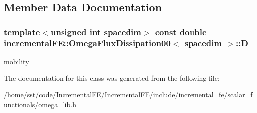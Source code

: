 \subsection{Member Data Documentation}
\subsubsection[{\texorpdfstring{D}{D}}]{\setlength{\rightskip}{0pt plus 5cm}template$<$unsigned int spacedim$>$ const double {\bf incremental\+F\+E\+::\+Omega\+Flux\+Dissipation00}$<$ spacedim $>$\+::D\hspace{0.3cm}{\ttfamily [private]}}\hypertarget{classincremental_f_e_1_1_omega_flux_dissipation00_ac0bf17df1157750f539c2cb1a2aabcd4}{}\label{classincremental_f_e_1_1_omega_flux_dissipation00_ac0bf17df1157750f539c2cb1a2aabcd4}
mobility 

The documentation for this class was generated from the following file\+:\begin{DoxyCompactItemize}
\item 
/home/sst/code/\+Incremental\+F\+E/\+Incremental\+F\+E/include/incremental\+\_\+fe/scalar\+\_\+functionals/\hyperlink{omega__lib_8h}{omega\+\_\+lib.\+h}\end{DoxyCompactItemize}
